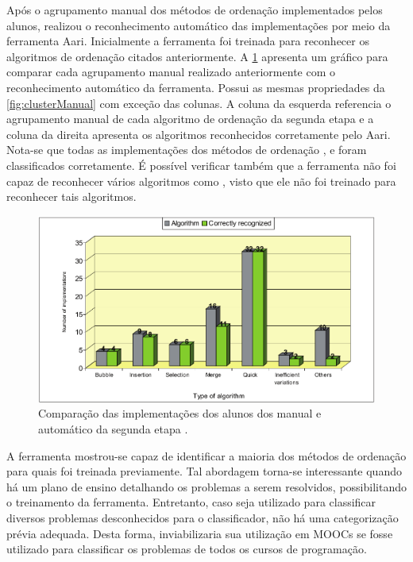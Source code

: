 	    Após o agrupamento manual dos métodos de ordenação implementados pelos alunos,
	     realizou o reconhecimento automático das
	    implementações por meio da ferramenta Aari. Inicialmente a ferramenta foi
	    treinada para reconhecer os algoritmos de ordenação citados anteriormente.
	    A \cref{fig:clusterAutomatico} apresenta um gráfico para comparar cada
	    agrupamento manual realizado anteriormente com o reconhecimento automático
	    da ferramenta. Possui as mesmas propriedades da \cref{fig:clusterManual}
	    com exceção das colunas. A coluna da esquerda referencia o agrupamento manual
	    de cada algoritmo de ordenação da segunda etapa e a coluna da direita apresenta
	    os algoritmos reconhecidos corretamente pelo Aari. Nota-se que todas as
	    implementações dos métodos de ordenação ,
	     e  foram classificados corretamente.
	    É possível verificar também que a ferramenta não foi capaz de reconhecer vários
	    algoritmos como , visto que ele não foi treinado para
	    reconhecer tais algoritmos.
	    
	    \begin{figure}[ht]
	        \centering
	        \includegraphics[scale=0.33]{imagem/clusterAutomatico.png}
	        \captionsetup{justification=centering}
	        \caption{Comparação das implementações dos alunos dos 
	        manual e automático da segunda etapa \cite{Taherkhani:2012}.}
	        \label{fig:clusterAutomatico}
	    \end{figure}
	    
	    A ferramenta mostrou-se capaz de identificar a maioria dos métodos de ordenação
	    para quais foi treinada previamente. Tal abordagem torna-se interessante quando
	    há um plano de ensino detalhando os problemas a serem resolvidos, possibilitando
	    o treinamento da ferramenta. Entretanto, caso seja utilizado para classificar
	    diversos problemas desconhecidos para o classificador, não há uma categorização
	    prévia adequada. Desta forma, inviabilizaria sua utilização em MOOCs se fosse
	    utilizado para classificar os problemas de todos os cursos de programação.
	    
